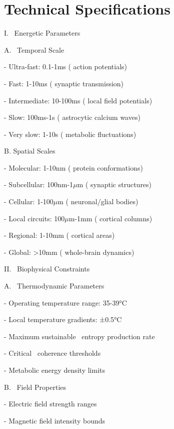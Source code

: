\section{Technical Specifications}

I.~ Energetic Parameters

A.~ Temporal Scale

- Ultra-fast: 0.1-1ms ( action potentials)

- Fast: 1-10ms ( synaptic transmission)

- Intermediate: 10-100ms ( local field potentials)

- Slow: 100ms-1s ( astrocytic calcium waves)

- Very slow: 1-10s ( metabolic fluctuations)

B. Spatial Scales

- Molecular: 1-10nm ( protein conformations)

- Subcellular: 100nm-1$\mu$m ( synaptic structures)

- Cellular: 1-100$\mu$m ( neuronal/glial bodies)

- Local circuits: 100$\mu$m-1mm ( cortical columns)

- Regional: 1-10mm ( cortical areas)

- Global: >10mm ( whole-brain dynamics)

II.~ Biophysical Constraints

A.~ Thermodynamic Parameters

- Operating temperature range: 35-39°C

- Local temperature gradients: ±0.5°C

- Maximum sustainable~ entropy production rate

- Critical~ coherence thresholds

- Metabolic energy density limits

B.~ Field Properties

- Electric field strength ranges

- Magnetic field intensity bounds

